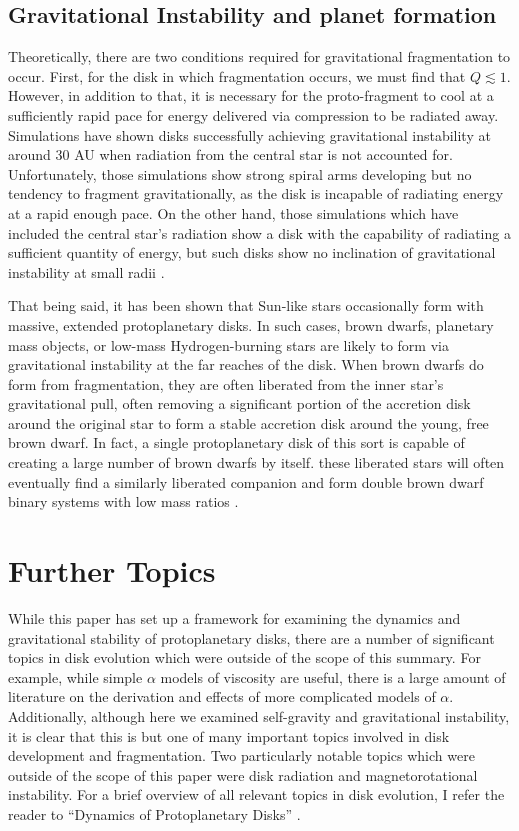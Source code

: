 \documentclass[aps,pra,twocolumn]{revtex4-1}
\begin{document}
\subsection{\label{section 3.3} Gravitational Instability and planet formation}
Theoretically, there are two conditions required for gravitational fragmentation to occur.  First, for the disk in which fragmentation occurs, we must find that $Q \lesssim 1$.  However, in addition to that, it is necessary for the proto-fragment to cool at a sufficiently rapid pace for energy delivered via compression to be radiated away.  Simulations have shown disks successfully achieving gravitational instability at around 30 AU when radiation from the central star is not accounted for.  Unfortunately, those simulations show strong spiral arms developing but no tendency to fragment gravitationally, as the disk is incapable of radiating energy at a rapid enough pace.  On the other hand, those simulations which have included the central star's radiation show a disk with the capability of radiating a sufficient quantity of energy, but such disks show no inclination of gravitational instability at small radii \cite{whitworth2007}.

That being said, it has been shown that Sun-like stars occasionally form with massive, extended protoplanetary disks.  In such cases, brown dwarfs, planetary mass objects, or low-mass Hydrogen-burning stars are likely to form via gravitational instability at the far reaches of the disk.  When brown dwarfs do form from fragmentation, they are often liberated from the inner star's gravitational pull, often removing a significant portion of the accretion disk around the original star to form a stable accretion disk around the young, free brown dwarf.  In fact, a single protoplanetary disk of this sort is capable of creating a large number of brown dwarfs by itself.  these liberated stars will often eventually find a similarly liberated companion and form double brown dwarf binary systems with low mass ratios \cite{hubber2007}.  



\section{\label{section 4} Further Topics}
While this paper has set up a framework for examining the dynamics and gravitational stability of protoplanetary disks, there are a number of significant topics in disk evolution which were outside of the scope of this summary.  For example, while simple $\alpha$ models of viscosity are useful, there is a large amount of literature on the derivation and effects of more complicated models of $\alpha$.  Additionally, although here we examined self-gravity and gravitational instability, it is clear that this is but one of many important topics involved in disk development and fragmentation.  Two particularly notable topics which were outside of the scope of this paper were disk radiation and magnetorotational instability.  For a brief overview of all relevant topics in disk evolution, I refer the reader to ``Dynamics of Protoplanetary Disks'' \cite{armitage2011}.


\end{document}
